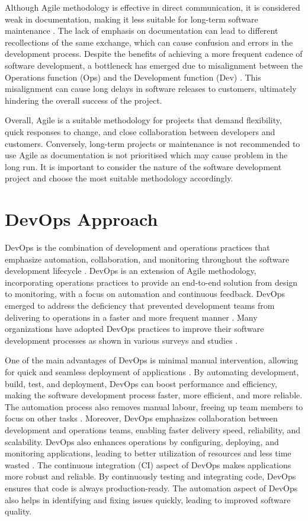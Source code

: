 Although Agile methodology is effective in direct communication, it is considered weak in documentation, making it less suitable for long-term software maintenance \cite{aaa, koch}. The lack of emphasis on documentation can lead to different recollections of the same exchange, which can cause confusion and errors in the development process. Despite the benefits of achieving a more frequent cadence of software development, a bottleneck has emerged due to misalignment between the Operations function (Ops) and the Development function (Dev) \cite{hlrf}. This misalignment can cause long delays in software releases to customers, ultimately hindering the overall success of the project.

Overall, Agile is a suitable methodology for projects that demand flexibility, quick responses to change, and close collaboration between developers and customers. Conversely, long-term projects or maintenance is not recommended to use Agile as documentation is not prioritised which may cause problem in the long run. It is important to consider the nature of the software development project and choose the most suitable methodology accordingly. 

\section{DevOps Approach}

DevOps is the combination of development and operations practices that emphasize automation, collaboration, and monitoring throughout the software development lifecycle \cite{joakim}. DevOps is an extension of Agile methodology, incorporating operations practices to provide an end-to-end solution from design to monitoring, with a focus on automation and continuous feedback. DevOps emerged to address the deficiency that prevented development teams from delivering to operations in a faster and more frequent manner \cite{hlrf}. Many organizations have adopted DevOps practices to improve their software development processes as shown in various surveys and studies \cite{spj}.

One of the main advantages of DevOps is minimal manual intervention, allowing for quick and seamless deployment of applications \cite{spj}. By automating development, build, test, and deployment, DevOps can boost performance and efficiency, making the software development process faster, more efficient, and more reliable. The automation process also removes manual labour, freeing up team members to focus on other tasks \cite{joakim}. Moreover, DevOps emphasizes collaboration between development and operations teams, enabling faster delivery speed, reliability, and scalability. DevOps also enhances operations by configuring, deploying, and monitoring applications, leading to better utilization of resources and less time wasted \cite{os}. The continuous integration (CI) aspect of DevOps makes applications more robust and reliable. By continuously testing and integrating code, DevOps ensures that code is always production-ready. The automation aspect of DevOps also helps in identifying and fixing issues quickly, leading to improved software quality.

